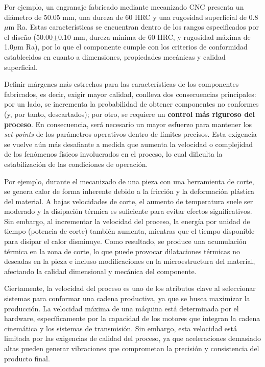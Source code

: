 Por ejemplo, un engranaje fabricado mediante mecanizado CNC presenta un diámetro de 50.05 mm, una dureza de 60 HRC y una rugosidad superficial de 0.8 $\mu$m Ra. Estas características se encuentran dentro de los rangos especificados por el diseño (50.00$\pm$0.10 mm, dureza mínima de 60 HRC, y rugosidad máxima de 1.0$\mu$m Ra), por lo que el componente cumple con los criterios de conformidad establecidos en cuanto a dimensiones, propiedades mecánicas y calidad superficial.

Definir márgenes más estrechos para las características de los componentes fabricados, es decir, exigir mayor calidad, conlleva dos consecuencias principales: por un lado, se incrementa la probabilidad de obtener componentes no conformes (y, por tanto, descartados); por otro, se requiere un \textbf{control más riguroso del proceso}. En consecuencia, será necesario un mayor esfuerzo para mantener los \textit{set-points} de los parámetros operativos dentro de límites precisos. Esta exigencia se vuelve aún más desafiante a medida que aumenta la velocidad o complejidad de los fenómenos físicos involucrados en el proceso, lo cual dificulta la estabilización de las condiciones de operación.

Por ejemplo, durante el mecanizado de una pieza con una herramienta de corte, se genera calor de forma inherente debido a la fricción y la deformación plástica del material. A bajas velocidades de corte, el aumento de temperatura suele ser moderado y la disipación térmica es suficiente para evitar efectos significativos. Sin embargo, al incrementar la velocidad del proceso, la energía por unidad de tiempo (potencia de corte) también aumenta, mientras que el tiempo disponible para disipar el calor disminuye. Como resultado, se produce una acumulación térmica en la zona de corte, lo que puede provocar dilataciones térmicas no deseadas en la pieza e incluso modificaciones en la microestructura del material, afectando la calidad dimensional y mecánica del componente.

Ciertamente, la velocidad del proceso es uno de los atributos clave al seleccionar sistemas para conformar una cadena productiva, ya que se busca maximizar la producción. La velocidad máxima de una máquina está determinada por el hardware, específicamente por la capacidad de los motores que integran la cadena cinemática y los sistemas de transmisión. Sin embargo, esta velocidad está limitada por las exigencias de calidad del proceso, ya que aceleraciones demasiado altas pueden generar vibraciones que comprometan la precisión y consistencia del producto final.


